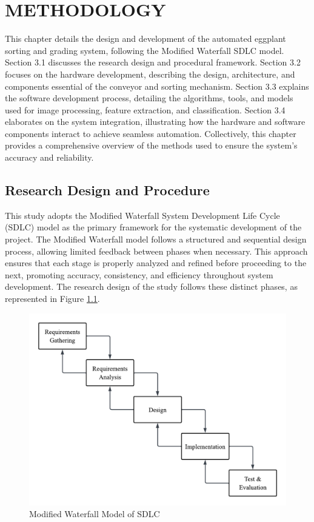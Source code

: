 
\chapter{METHODOLOGY}
{\baselineskip

This chapter details the design and development of the automated eggplant sorting and grading system, following the Modified Waterfall SDLC model. Section 3.1 discusses the research design and procedural framework. Section 3.2 focuses on the hardware development, describing the design, architecture, and components essential of the conveyor and sorting mechanism. Section 3.3 explains the software development process, detailing the algorithms, tools, and models used for image processing, feature extraction, and classification. Section 3.4 elaborates on the system integration, illustrating how the hardware and software components interact to achieve seamless automation. Collectively, this chapter provides a comprehensive overview of the methods used to ensure the system's accuracy and reliability.

\section{Research Design and Procedure}
This study adopts the Modified Waterfall System Development Life Cycle (SDLC) model as the primary framework for the systematic development of the project. The Modified Waterfall model follows a structured and sequential design process, allowing limited feedback between phases when necessary. This approach ensures that each stage is properly analyzed and refined before proceeding to the next, promoting accuracy, consistency, and efficiency throughout system development. The research design of the study follows these distinct phases, as represented in Figure \ref{fig:researchdesign}.

\begin{figure}
	\centering
	\includegraphics[width=0.7\linewidth]{figures/research_design}
	\caption{Modified Waterfall Model of SDLC}
	\label{fig:researchdesign}
\end{figure}

}
